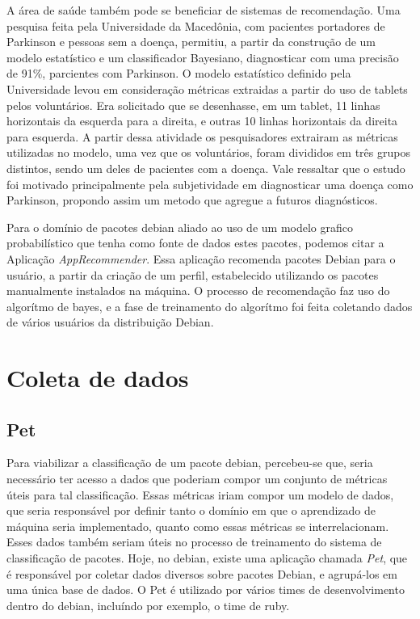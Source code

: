 A área de saúde também pode se beneficiar de sistemas de recomendação. Uma pesquisa feita pela Universidade da Macedônia,  com pacientes portadores de Parkinson e pessoas sem a doença, permitiu, a partir da construção de um modelo estatístico e um classificador Bayesiano, diagnosticar com uma precisão de 91\%, parcientes com Parkinson\cite{Kotsavasiloglou}. O modelo estatístico definido pela Universidade levou em consideração métricas extraidas a partir do uso de tablets pelos voluntários. Era solicitado que se desenhasse, em um tablet, 11 linhas horizontais da esquerda para a direita, e outras 10 linhas horizontais da direita para esquerda. A partir dessa atividade os pesquisadores extrairam as métricas utilizadas no modelo, uma vez que os voluntários, foram divididos em três grupos distintos, sendo um deles de pacientes com a doença. Vale ressaltar que o estudo foi motivado principalmente pela subjetividade em diagnosticar uma doença como Parkinson, propondo assim um metodo que agregue a futuros diagnósticos.

Para o domínio de pacotes debian aliado ao uso de um modelo grafico probabilístico que tenha como fonte de dados estes pacotes, podemos citar a Aplicação \textit{AppRecommender}. Essa aplicação recomenda pacotes Debian para o usuário,
a partir da criação de um perfil, estabelecido utilizando os pacotes manualmente instalados na máquina. 
O processo de recomendação faz uso do algorítmo de bayes, e a fase de treinamento do algorítmo foi feita coletando dados de vários usuários da distribuição Debian.


\section{Coleta de dados}

\subsection{Pet}
Para viabilizar a classificação de um pacote debian, percebeu-se que, seria necessário ter acesso a dados que poderiam compor um conjunto de métricas úteis para tal classificação.
Essas métricas iriam compor um modelo de dados, que  seria responsável por definir tanto o domínio em que o aprendizado de máquina seria implementado, quanto como essas métricas se interrelacionam.
Esses dados também seriam úteis no processo de treinamento do sistema de classificação de pacotes.
Hoje, no debian, existe uma aplicação chamada \textit{Pet}, que é responsável por coletar dados diversos sobre pacotes Debian, e agrupá-los em uma única base de dados. O Pet é utilizado por vários times de desenvolvimento dentro do debian, incluíndo por exemplo, o time de ruby.  

